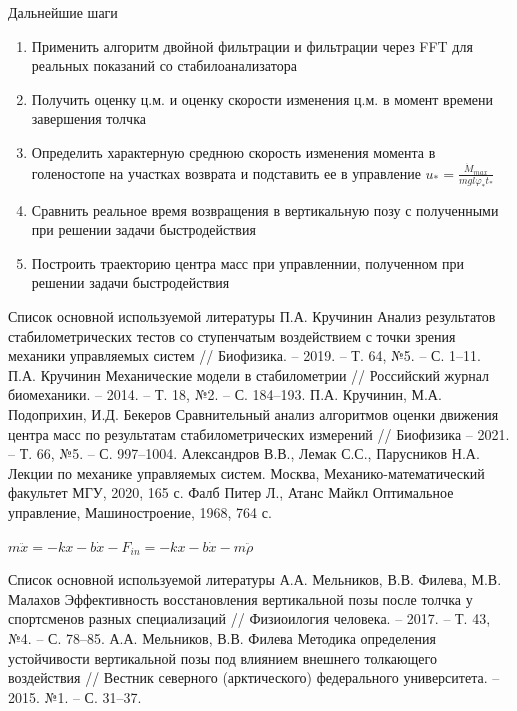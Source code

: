 \documentclass[10pt]{beamer}
\begin{document}
\begin{frame}{Дальнейшие шаги}
	\begin{enumerate}
		\item Применить алгоритм двойной фильтрации и фильтрации через FFT для реальных показаний со стабилоанализатора
		\item Получить оценку ц.м. и оценку скорости изменения ц.м. в момент времени завершения толчка
		\item Определить характерную среднюю скорость изменения момента в голеностопе на участках возврата и подставить ее в управление $u_{\ast}=\frac{\dot{M}_{max}}{mgl\varphi_\ast t_\ast}$
		\item Сравнить реальное время возвращения в вертикальную позу с полученными при решении задачи быстродействия
		\item Построить траекторию центра масс при управленнии, полученном при решении задачи быстродействия
	  \end{enumerate}
	
\end{frame}


\begin{thebibliography}{15}
	\begin{frame}{Список основной используемой литературы}
		П.А. Кручинин Анализ результатов стабилометрических тестов со ступенчатым воздействием с точки зрения механики управляемых систем
		// Биофизика. – 2019. – Т. 64, №5. – С. 1–11.
		П.А. Кручинин Механические модели в стабилометрии // Российский журнал биомеханики. – 2014. – Т. 18, №2. – С. 184–193.
		П.А. Кручинин, М.А. Подоприхин, И.Д. Бекеров Сравнительный анализ алгоритмов оценки движения центра масс по результатам стабилометрических измерений // Биофизика – 2021. – Т. 66, №5. – С. 997–1004. 
		 Александров В.В., Лемак С.С., Парусников Н.А. Лекции по механике управляемых систем. Москва, Механико-математический факультет МГУ, 2020, 165 с.
		Фалб Питер Л., Атанс Майкл Оптимальное управление, Машиностроение, 1968, 764 с.
	\end{frame}
	$m\ddot{x}=-kx-b\dot{x}-F_{in}=-kx-b\dot{x}-m\ddot{\rho}$
	\begin{frame}{Список основной используемой литературы}
		А.А. Мельников, В.В. Филева, М.В. Малахов Эффективность восстановления вертикальной позы
		после толчка у спортсменов разных специализаций // Физиоилогия человека. – 2017. – Т. 43, №4. – С. 78–85.
		А.А. Мельников, В.В. Филева Методика определения устойчивости вертикальной позы под влиянием
		 внешнего толкающего воздействия // Вестник северного (арктического) федерального университета. – 2015. №1. – С. 31–37.
	\end{frame}

\end{thebibliography}
\end{document}
